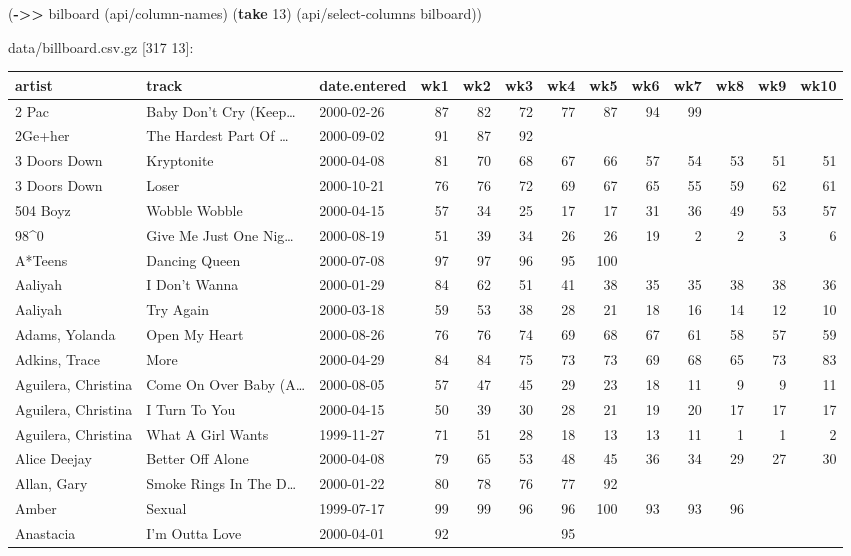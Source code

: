 \documentclass[]{article}
\newenvironment{Shaded}{\begin{snugshade}}{\end{snugshade}}
\newcommand{\KeywordTok}[1]{\textcolor[rgb]{0.13,0.29,0.53}{\textbf{#1}}}
\newcommand{\DecValTok}[1]{\textcolor[rgb]{0.00,0.00,0.81}{#1}}
\newcommand{\NormalTok}[1]{#1}
\begin{document}
\begin{Shaded}
\begin{Highlighting}[]
\NormalTok{(}\KeywordTok{->>}\NormalTok{ bilboard}
\NormalTok{     (api/column-names)}
\NormalTok{     (}\KeywordTok{take} \DecValTok{13}\NormalTok{)}
\NormalTok{     (api/select-columns bilboard))}
\end{Highlighting}
\end{Shaded}

data/billboard.csv.gz {[}317 13{]}:

\begin{longtable}[]{@{}lllrrrrrrrrrr@{}}
\toprule
artist & track & date.entered & wk1 & wk2 & wk3 & wk4 & wk5 & wk6 & wk7
& wk8 & wk9 & wk10\tabularnewline
\midrule
\endhead
2 Pac & Baby Don't Cry (Keep\ldots{} & 2000-02-26 & 87 & 82 & 72 & 77 &
87 & 94 & 99 & & &\tabularnewline
2Ge+her & The Hardest Part Of \ldots{} & 2000-09-02 & 91 & 87 & 92 & & &
& & & &\tabularnewline
3 Doors Down & Kryptonite & 2000-04-08 & 81 & 70 & 68 & 67 & 66 & 57 &
54 & 53 & 51 & 51\tabularnewline
3 Doors Down & Loser & 2000-10-21 & 76 & 76 & 72 & 69 & 67 & 65 & 55 &
59 & 62 & 61\tabularnewline
504 Boyz & Wobble Wobble & 2000-04-15 & 57 & 34 & 25 & 17 & 17 & 31 & 36
& 49 & 53 & 57\tabularnewline
98\^{}0 & Give Me Just One Nig\ldots{} & 2000-08-19 & 51 & 39 & 34 & 26
& 26 & 19 & 2 & 2 & 3 & 6\tabularnewline
A*Teens & Dancing Queen & 2000-07-08 & 97 & 97 & 96 & 95 & 100 & & & &
&\tabularnewline
Aaliyah & I Don't Wanna & 2000-01-29 & 84 & 62 & 51 & 41 & 38 & 35 & 35
& 38 & 38 & 36\tabularnewline
Aaliyah & Try Again & 2000-03-18 & 59 & 53 & 38 & 28 & 21 & 18 & 16 & 14
& 12 & 10\tabularnewline
Adams, Yolanda & Open My Heart & 2000-08-26 & 76 & 76 & 74 & 69 & 68 &
67 & 61 & 58 & 57 & 59\tabularnewline
Adkins, Trace & More & 2000-04-29 & 84 & 84 & 75 & 73 & 73 & 69 & 68 &
65 & 73 & 83\tabularnewline
Aguilera, Christina & Come On Over Baby (A\ldots{} & 2000-08-05 & 57 &
47 & 45 & 29 & 23 & 18 & 11 & 9 & 9 & 11\tabularnewline
Aguilera, Christina & I Turn To You & 2000-04-15 & 50 & 39 & 30 & 28 &
21 & 19 & 20 & 17 & 17 & 17\tabularnewline
Aguilera, Christina & What A Girl Wants & 1999-11-27 & 71 & 51 & 28 & 18
& 13 & 13 & 11 & 1 & 1 & 2\tabularnewline
Alice Deejay & Better Off Alone & 2000-04-08 & 79 & 65 & 53 & 48 & 45 &
36 & 34 & 29 & 27 & 30\tabularnewline
Allan, Gary & Smoke Rings In The D\ldots{} & 2000-01-22 & 80 & 78 & 76 &
77 & 92 & & & & &\tabularnewline
Amber & Sexual & 1999-07-17 & 99 & 99 & 96 & 96 & 100 & 93 & 93 & 96 &
&\tabularnewline
Anastacia & I'm Outta Love & 2000-04-01 & 92 & & & 95 & & & & &

\end{longtable}
\end{document}
